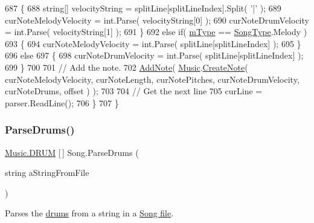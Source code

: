 \begin{DoxyCode}
687             \{
688                 \textcolor{keywordtype}{string}[] velocityString = splitLine[splitLineIndex].Split( \textcolor{charliteral}{'|'} );
689                 curNoteMelodyVelocity = \textcolor{keywordtype}{int}.Parse( velocityString[0] );
690                 curNoteDrumVelocity = \textcolor{keywordtype}{int}.Parse( velocityString[1] );
691             \}
692             \textcolor{keywordflow}{else} \textcolor{keywordflow}{if}( \hyperlink{group___song_priv_var_gaf3b9d0f461522324f897b746311b43c5}{mType} == \hyperlink{group___song_enums_gae681a1f001333e39fc1cb4fea97bfe1b}{SongType}.Melody )
693             \{
694                 curNoteMelodyVelocity = \textcolor{keywordtype}{int}.Parse( splitLine[splitLineIndex] );
695             \}
696             \textcolor{keywordflow}{else}
697             \{
698                 curNoteDrumVelocity = \textcolor{keywordtype}{int}.Parse( splitLine[splitLineIndex] );
699             \}
700 
701             \textcolor{comment}{// Add the note.}
702             \hyperlink{group___song_pub_func_gab7c8fe4dc29f5ae7b7728c583fe51f7e}{AddNote}( \hyperlink{class_music}{Music}.\hyperlink{group___music_stat_func_gaaf74885e43eb623f64f961985fadcd08}{CreateNote}( curNoteMelodyVelocity, curNoteLength, 
      curNotePitches, curNoteDrumVelocity, curNoteDrums, offset ) );
703 
704             \textcolor{comment}{// Get the next line}
705             curLine = parser.ReadLine();
706         \}
707     \}
\end{DoxyCode}
\mbox{\label{group___song_priv_func_gaaa4ca12f0885a34cbfb09bb7a1db178b}} 
\subsubsection{\texorpdfstring{Parse\+Drums()}{ParseDrums()}}
{\footnotesize\ttfamily \hyperlink{group___music_enums_gade475b4382c7066d1af13e7c13c029b6}{Music.\+D\+R\+UM} \mbox{[}$\,$\mbox{]} Song.\+Parse\+Drums (\begin{DoxyParamCaption}\item[{string}]{a\+String\+From\+File }\end{DoxyParamCaption})\hspace{0.3cm}{\ttfamily [private]}}



Parses the \hyperlink{group___music_enums_gade475b4382c7066d1af13e7c13c029b6}{drums} from a string in a \hyperlink{group___song_group_DocSongFileFormat}{Song file}. 


